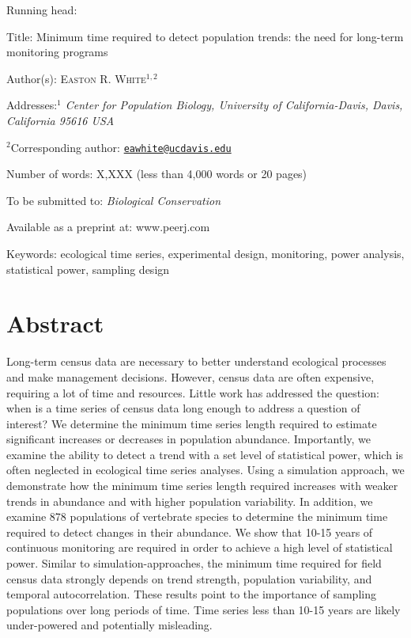 \documentclass[12pt,]{article}
\title{}
\author{}
\date{}
\begin{document}
Running head: \vspace{3 mm}

Title: Minimum time required to detect population trends: the need for
long-term monitoring programs \vspace{7 mm}

Author(s): \textsc{Easton R. White$^{1,2}$} \vspace{3 mm}

Addresses:\emph{$^1$ Center for Population Biology, University of California-Davis, Davis, California 95616 USA}
\vspace{3 mm}

\(^2\)Corresponding author:
\href{mailto:eawhite@ucdavis.edu}{\nolinkurl{eawhite@ucdavis.edu}}
\vspace{3 mm}

Number of words: X,XXX (less than 4,000 words or 20 pages) \vspace{3 mm}

To be submitted to: \emph{Biological Conservation} \vspace{3 mm}

Available as a preprint at: www.peerj.com \vspace{3 mm}

Keywords: ecological time series, experimental design, monitoring, power
analysis, statistical power, sampling design

\vspace{3 mm}

\pagebreak 

\linenumbers

\section{Abstract}\label{abstract}

Long-term census data are necessary to better understand ecological
processes and make management decisions. However, census data are often
expensive, requiring a lot of time and resources. Little work has
addressed the question: when is a time series of census data long enough
to address a question of interest? We determine the minimum time series
length required to estimate significant increases or decreases in
population abundance. Importantly, we examine the ability to detect a
trend with a set level of statistical power, which is often neglected in
ecological time series analyses. Using a simulation approach, we
demonstrate how the minimum time series length required increases with
weaker trends in abundance and with higher population variability. In
addition, we examine 878 populations of vertebrate species to determine
the minimum time required to detect changes in their abundance. We show
that 10-15 years of continuous monitoring are required in order to
achieve a high level of statistical power. Similar to
simulation-approaches, the minimum time required for field census data
strongly depends on trend strength, population variability, and temporal
autocorrelation. These results point to the importance of sampling
populations over long periods of time. Time series less than 10-15 years
are likely under-powered and potentially misleading.
\end{document}

